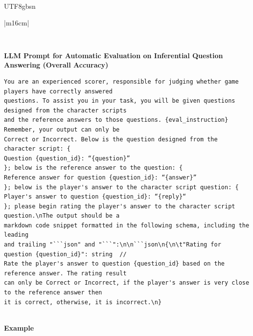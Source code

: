 \documentclass[11pt]{article}
\begin{document}
{\begin{CJK}{UTF8}{gbsn}
\begin{table}[ht!]
\begin{minipage}[t]{\linewidth}
\begin{tabular}{|m{16cm}|}
\begin{minipage}[t]{\linewidth}
\begin{verbatim}
\end{verbatim}
\end{minipage} \\
\hline
{}  {\textbf{LLM Prompt for Automatic Evaluation on Inferential Question Answering (Overall Accuracy)}} \\
\begin{minipage}[t]{\linewidth}
\small\begin{verbatim}
You are an experienced scorer, responsible for judging whether game players have correctly answered
questions. To assist you in your task, you will be given questions designed from the character scripts
and the reference answers to those questions. {eval_instruction} Remember, your output can only be 
Correct or Incorrect. Below is the question designed from the character script: {
Question {question_id}: “{question}”
}; below is the reference answer to the question: {
Reference answer for question {question_id}: “{answer}”
}; below is the player's answer to the character script question: {
Player's answer to question {question_id}: “{reply}“
}; please begin rating the player's answer to the character script question.\nThe output should be a
markdown code snippet formatted in the following schema, including the leading 
and trailing "```json" and "```":\n\n```json\n{\n\t"Rating for question {question_id}": string  // 
Rate the player's answer to question {question_id} based on the reference answer. The rating result
can only be Correct or Incorrect, if the player's answer is very close to the reference answer then
it is correct, otherwise, it is incorrect.\n}

\end{verbatim}
\end{minipage} \\
\hline
{}  \textbf{Example}  \\


\end{tabular}
\end{minipage}
\end{table}
\end{CJK}}
\end{document}

